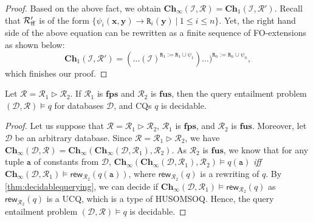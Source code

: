 \documentclass[10pt,a4paper]{amsart}
\theoremstyle{definition}
\numberwithin{equation}{section}
\providecommand{\sa}{\mathbf{Ch}_{\infty}}
\theoremstyle{plain}
\theoremstyle{definition}
\theoremstyle{myexample}
\theoremstyle{plain}
\newenvironment{customthm}[1]
  {\renewcommand\theinnercustomthm{#1}\innercustomthm}
  {\endinnercustomthm}
\theoremstyle{definition}
\renewcommand{\vec}[1]{\boldsymbol{#1}}
\newcommand{\instance}{\mathcal{I}}
\newcommand{\inst}{\instance}
\newcommand{\database}{\mathcal{D}}
\newcommand{\db}{\database}
\newcommand{\cut}{\triangleright}
\newcommand{\fcn}[1]{\mathsf{#1}}
\newcommand{\ruleset}{\calr}
\newcommand{\fus}{\mathbf{fus}}
\newcommand{\fps}{\mathbf{fps}} %
\newcommand{\hcs}{\fps}
\newcommand{\fhcs}{\hcs}
\newcommand{\chase}{\mathbf{Ch}}
\renewcommand{\sa}{\mathbf{Ch}_{\infty}}
\newcommand{\rewrs}[2]{\fcn{rew}_{#1}(#2)}
\newcommand{\calr}{\mathcal{R}}
\newcommand{\pred}[1]{\mathtt{#1}}
\newcommand{\const}[1]{\mathtt{#1}}
\newcommand{\rpred}{\pred{R}}
\newcommand{\query}{q}
\newcommand{\iffi}{\textit{iff} } %
\begin{document}
\begin{proof}
Based on the above fact, we obtain
$
\chase_{\infty}(\inst,\ruleset) = \chase_{1}(\inst,\ruleset').
$
Recall that $\ruleset_{\smash{\mathrm{ff}}}'$ is of the form $\{\psi_{i}(\vec{x}, \vec{y}) \rightarrow \rpred_{i}(\vec{y}) \ | \ 1 \leq i \leq n\}$. Yet, the right hand side of the above equation can be rewritten as a finite sequence of FO-extensions as shown below:
$$
\chase_{1}(\inst, \ruleset') = (\ldots(\inst)^{\rpred_{1}:= \rpred_{1} \cup \psi_{1}})\ldots)^{\rpred_{n}:= \rpred_{n} \cup \psi_{n}},
$$%
which finishes our proof.
\end{proof}

\begin{customthm}{\ref{thm:fcs-fus-decidable}}
	Let $\ruleset = \ruleset_{1} \cut \ruleset_{2}$. If $\ruleset_{1}$ is $\fhcs$ and $\ruleset_{2}$ is $\fus$, then the query entailment problem $(\db,\ruleset) \models q$ for databases $\db$, and CQs $q$ is decidable.
\end{customthm}

\begin{proof} Let us suppose that $\ruleset = \ruleset_{1} \cut \ruleset_{2}$, $\ruleset_{1}$ is $\fhcs$, and $\ruleset_{2}$ is $\fus$. Moreover, let $\db$ be an arbitrary database. Since $\ruleset = \ruleset_{1} \cut \ruleset_{2}$, we have $\sa(\db,\ruleset) = \sa(\sa(\db,\ruleset_{1}),\ruleset_{2})$. As $\ruleset_{2}$ is $\fus$, we know that for any tuple $\vec{\const{a}}$ of constants from $\db$, $\sa(\sa(\db,\ruleset_{1}),\ruleset_{2}) \models q(\vec{\const{a}})$ \iffi $\sa(\db,\ruleset_{1}) \models \rewrs{\ruleset_{2}}{\query(\vec{\const{a}})}$, where $\rewrs{\ruleset_{2}}{\query}$ is a rewriting of $\query$. By \cref{thm:decidablequerying}, we can decide if $\sa(\db,\ruleset_{1}) \models \rewrs{\ruleset_{2}}{\query}$ as $\rewrs{\ruleset_{2}}{\query}$ is a UCQ, which is a type of HUSOMSOQ. Hence, the query entailment problem $(\db,\ruleset) \models q$ is decidable. %
\end{proof}
\end{document}
